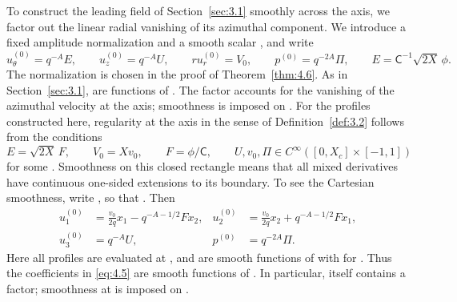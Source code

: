 To construct the leading field of Section~\ref{sec:3.1} smoothly across the
axis, we factor out the linear radial vanishing of its azimuthal component. We
introduce a fixed amplitude normalization  and a
smooth scalar , and write
\begin{equation}
 u_\theta^{(0)}=q^{-A}E,\qquad
 u_z^{(0)}=q^{-A}U,\qquad
 ru_r^{(0)}=V_0,\qquad
 p^{(0)}=q^{-2A}\Pi,\qquad
 E=\mathsf C^{-1}\sqrt{2X}\,\phi.
\tag{4.3}\label{eq:4.3}
\end{equation}
The normalization  is chosen in the proof of
Theorem~\ref{thm:4.6}. As in Section~\ref{sec:3.1},
 are functions of
. The factor
 accounts for the vanishing of the azimuthal
velocity at the axis; smoothness is imposed on
. For the profiles constructed here, regularity at
the axis in the sense of Definition~\ref{def:3.2} follows from the conditions
\begin{equation}
 E=\sqrt{2X}\,F,\qquad V_0=Xv_0,\qquad
 F=\phi/\mathsf C,\qquad
 U,v_0,\Pi\in C^\infty([0,X_c]\times[-1,1])
\tag{4.4}\label{eq:4.4}
\end{equation}
for some . Smoothness on this closed rectangle
means that all mixed  derivatives have continuous
one-sided extensions to its boundary. To see the Cartesian smoothness, write
, so that
. Then
\begin{equation}
\begin{aligned}
 u_1^{(0)}&=\frac{v_0}{2q}x_1-q^{-A-1/2}Fx_2,
 &u_2^{(0)}&=\frac{v_0}{2q}x_2+q^{-A-1/2}Fx_1,\\
 u_3^{(0)}&=q^{-A}U,
 &p^{(0)}&=q^{-2A}\Pi.
\end{aligned}
\tag{4.5}\label{eq:4.5}
\end{equation}
Here all profiles are evaluated at , and
 are smooth functions of
 with  for
. Thus the coefficients in \eqref{eq:4.5} are smooth
functions of . In particular,
 itself contains a  factor;
smoothness at  is imposed on
.

